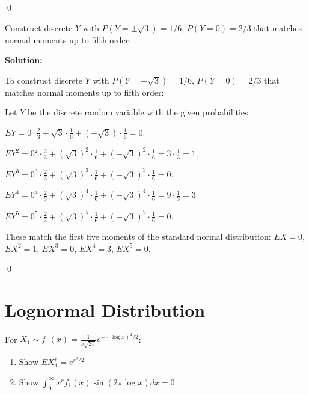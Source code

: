 \qed
\begin{problembox}
Construct discrete $Y$ with $P(Y=\pm\sqrt{3})=1/6$, $P(Y=0)=2/3$ that matches normal moments up to fifth order.
\end{problembox}

\noindent\textbf{Solution:}

To construct discrete $Y$ with $P(Y=\pm\sqrt{3})=1/6$, $P(Y=0)=2/3$ that matches normal moments up to fifth order:

Let $Y$ be the discrete random variable with the given probabilities.

$EY = 0 \cdot \frac{2}{3} + \sqrt{3} \cdot \frac{1}{6} + (-\sqrt{3}) \cdot \frac{1}{6} = 0$.

$EY^2 = 0^2 \cdot \frac{2}{3} + (\sqrt{3})^2 \cdot \frac{1}{6} + (-\sqrt{3})^2 \cdot \frac{1}{6} = 3 \cdot \frac{1}{3} = 1$.

$EY^3 = 0^3 \cdot \frac{2}{3} + (\sqrt{3})^3 \cdot \frac{1}{6} + (-\sqrt{3})^3 \cdot \frac{1}{6} = 0$.

$EY^4 = 0^4 \cdot \frac{2}{3} + (\sqrt{3})^4 \cdot \frac{1}{6} + (-\sqrt{3})^4 \cdot \frac{1}{6} = 9 \cdot \frac{1}{3} = 3$.

$EY^5 = 0^5 \cdot \frac{2}{3} + (\sqrt{3})^5 \cdot \frac{1}{6} + (-\sqrt{3})^5 \cdot \frac{1}{6} = 0$.

These match the first five moments of the standard normal distribution: $EX = 0$, $EX^2 = 1$, $EX^3 = 0$, $EX^4 = 3$, $EX^5 = 0$.


\qed
\section{Lognormal Distribution}

\begin{problembox}
For $X_1 \sim f_1(x) = \frac{1}{x\sqrt{2\pi}}e^{-(\log x)^2/2}$:
\begin{enumerate}[label=(\alph*)]
    \item Show $EX_1^r = e^{r^2/2}$
    \item Show $\int_0^\infty x^r f_1(x)\sin(2\pi\log x)dx = 0$
\end{enumerate}
\end{problembox}

